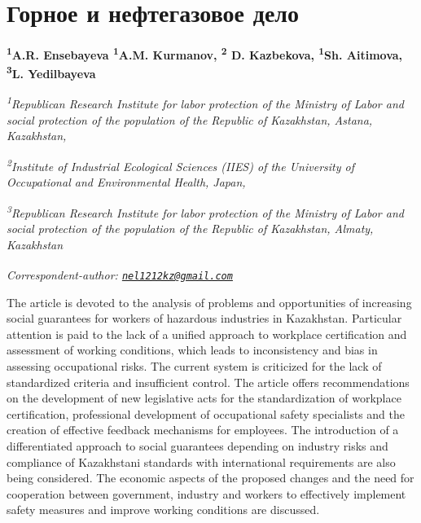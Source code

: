 \newpage
\let\cleardoublepage\clearpage
\chapter{Горное и нефтегазовое дело}

\begin{articleheader}

{\bfseries
\textsuperscript{1}A.R. Ensebayeva\textsuperscript{\envelope }\authorid
\textsuperscript{1}A.M. Kurmanov\authorid,
\textsuperscript{2} D. Kazbekova\authorid,
\textsuperscript{1}Sh. Aitimova\authorid,
\textsuperscript{3}L. Yedilbayeva\authorid}
\end{articleheader}

\begin{affiliation}
\emph{\textsuperscript{1}Republican Research Institute for labor protection of the Ministry of Labor and social protection of the population of the Republic of Kazakhstan, Astana, Kazakhstan,}

\emph{\textsuperscript{2}Institute of Industrial Ecological Sciences (IIES) of the University of Occupational and Environmental Health, Japan,}

\emph{\textsuperscript{3}Republican Research Institute for labor protection of the Ministry of Labor and social protection of the population of the Republic of Kazakhstan, Almaty, Kazakhstan}

\raggedright \textsuperscript{\envelope }{\em Correspondent-author: \href{mailto:nel1212kz@gmail.com}{\nolinkurl{nel1212kz@gmail.com}}}
\end{affiliation}

The article is devoted to the analysis of problems and opportunities of
increasing social guarantees for workers of hazardous industries in
Kazakhstan. Particular attention is paid to the lack of a unified
approach to workplace certification and assessment of working
conditions, which leads to inconsistency and bias in assessing
occupational risks. The current system is criticized for the lack of
standardized criteria and insufficient control. The article offers
recommendations on the development of new legislative acts for the
standardization of workplace certification, professional development of
occupational safety specialists and the creation of effective feedback
mechanisms for employees. The introduction of a differentiated approach
to social guarantees depending on industry risks and compliance of
Kazakhstani standards with international requirements are also being
considered. The economic aspects of the proposed changes and the need
for cooperation between government, industry and workers to effectively
implement safety measures and improve working conditions are discussed.

